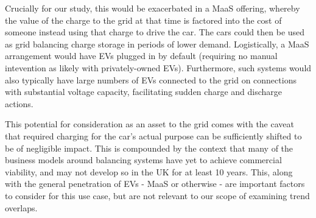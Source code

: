 \documentclass[journal]{IEEEtran}
\begin{document}
Crucially for our study, this would be exacerbated in a MaaS offering,
whereby the value of the charge to the grid at that time is factored
into the cost of someone instead using that charge to drive the
car. The cars could then be used as grid balancing charge storage in
periods of lower demand. Logistically, a MaaS arrangement would have EVs plugged in by default (requiring no manual intevention as likely with privately-owned EVs). Furthermore, such systems would also typically have large numbers of EVs connected to the grid on connections with substantial voltage capacity, facilitating sudden charge and discharge actions. 

This potential for consideration as an asset to the grid comes with the caveat that required charging for the car's actual purpose can be sufficiently shifted to be of negligible impact. This is compounded by the context that many of the business models around balancing systems have yet to achieve commercial viability, and may not develop so in the UK for at least 10 years. This, along with the general penetration of EVs - MaaS or otherwise - are important factors to consider for this use case, but are not relevant to our scope of examining trend overlaps. 





\end{document}

